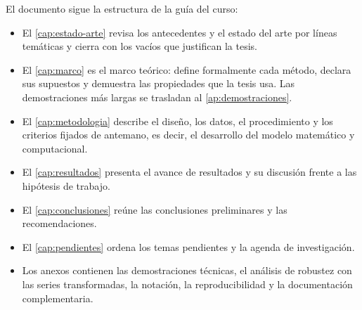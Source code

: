 El documento sigue la estructura de la guía del curso:

\begin{itemize}[leftmargin=*]
  \item El \cref{cap:estado-arte} revisa los antecedentes y el estado del arte por líneas
    temáticas y cierra con los vacíos que justifican la tesis.
  \item El \cref{cap:marco} es el marco teórico: define formalmente cada método, declara sus
    supuestos y demuestra las propiedades que la tesis usa. Las demostraciones más largas se
    trasladan al \cref{ap:demostraciones}.
  \item El \cref{cap:metodologia} describe el diseño, los datos, el procedimiento y los criterios
    fijados de antemano, es decir, el desarrollo del modelo matemático y computacional.
  \item El \cref{cap:resultados} presenta el avance de resultados y su discusión frente a las
    hipótesis de trabajo.
  \item El \cref{cap:conclusiones} reúne las conclusiones preliminares y las recomendaciones.
  \item El \cref{cap:pendientes} ordena los temas pendientes y la agenda de investigación.
  \item Los anexos contienen las demostraciones técnicas, el análisis de robustez con las series
    transformadas, la notación, la reproducibilidad y la documentación complementaria.
\end{itemize}

